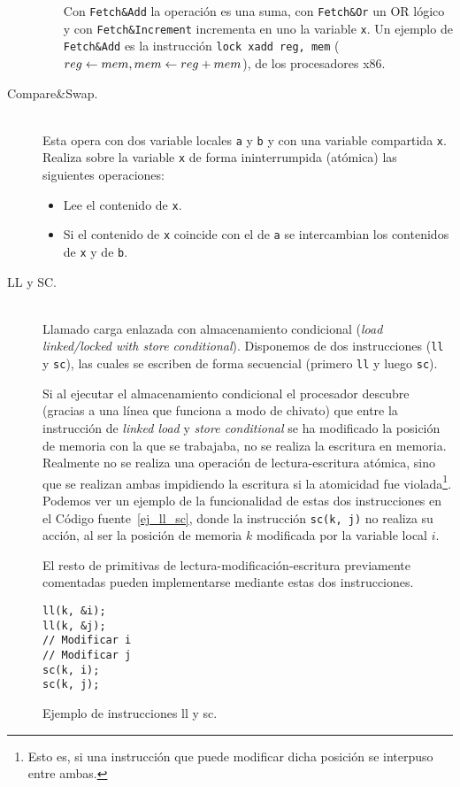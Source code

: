 \begin{description}
\begin{itemize}
                Con \verb|Fetch&Add| la operación es una suma, con \verb|Fetch&Or| un OR lógico y con \verb|Fetch&Increment| incrementa en uno la variable \verb|x|. Un ejemplo de \verb|Fetch&Add| es la instrucción \verb|lock xadd reg, mem| (${reg\leftarrow mem},\newline {mem\leftarrow reg + mem}$), de los procesadores x86.
        \end{itemize}
    \item [Compare\&Swap.]~\\
        Esta opera con dos variable locales \verb|a| y \verb|b| y con una variable compartida \verb|x|. Realiza sobre la variable \verb|x| de forma ininterrumpida (atómica) las siguientes operaciones:
        \begin{itemize}
            \item Lee el contenido de \verb|x|.
            \item Si el contenido de \verb|x| coincide con el de \verb|a| se intercambian los contenidos de \verb|x| y de \verb|b|.
        \end{itemize}
    \item [LL y SC.]~\\
        Llamado carga enlazada con almacenamiento condicional (\emph{load linked/locked with store conditional}). Disponemos de dos instrucciones (\verb|ll| y \verb|sc|), las cuales se escriben de forma secuencial (primero \verb|ll| y luego \verb|sc|).

        Si al ejecutar el almacenamiento condicional el procesador descubre (gracias a una línea que funciona a modo de chivato) que entre la instrucción de \emph{linked load} y \emph{store conditional} se ha modificado la posición de memoria con la que se trabajaba, no se realiza la escritura en memoria. Realmente no se realiza una operación de lectura-escritura atómica, sino que se realizan ambas impidiendo la escritura si la atomicidad fue violada\footnote{Esto es, si una instrucción que puede modificar dicha posición se interpuso entre ambas.}. Podemos ver un ejemplo de la funcionalidad de estas dos instrucciones en el Código fuente~\ref{ej_ll_sc}, donde la instrucción \verb|sc(k, j)| no realiza su acción, al ser la posición de memoria $k$ modificada por la variable local $i$.

        El resto de primitivas de lectura-modificación-escritura previamente comentadas pueden implementarse mediante estas dos instrucciones.
\begin{listing}[H]
\begin{verbatim}
ll(k, &i);
ll(k, &j);
// Modificar i
// Modificar j
sc(k, i);
sc(k, j);
\end{verbatim}
\caption{Ejemplo de instrucciones ll y sc.}
\label{ej_ll_sc}
\end{listing}

\end{description}
